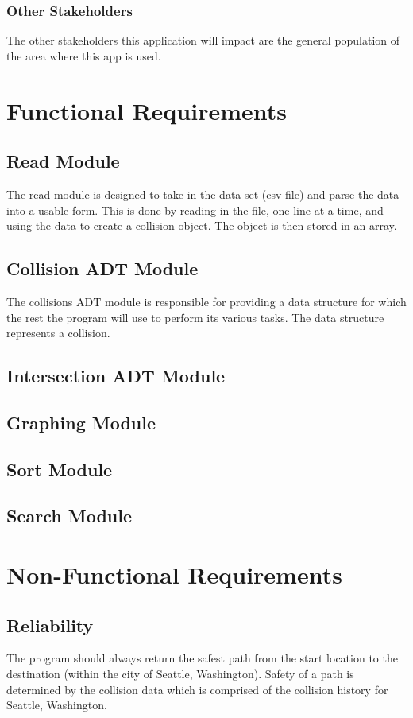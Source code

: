 \documentclass[12pt]{article}
\begin{document}
    \subsubsection{Other Stakeholders}
    The other stakeholders this application will impact are the general population of the area where this app is used.

\section{Functional Requirements}
\subsection{Read Module}
The read module is designed to take in the data-set (csv file) and parse the data into a usable form. This is done by reading in the file, one line at a time, and using the data to create a collision object. The object is then stored in an array.

\subsection{Collision ADT Module}
The collisions ADT module is responsible for providing a data structure for which the rest the program will use to perform its various tasks. The data structure represents a collision.

\subsection{Intersection ADT Module}


\subsection{Graphing Module}


\subsection{Sort Module}


\subsection{Search Module}


\section{Non-Functional Requirements}
\subsection{Reliability}
The program should always return the safest path from the start location to the destination (within the city of Seattle, Washington). Safety of a path is determined by the collision data which is comprised of the collision history for Seattle, Washington.
\end{document}
